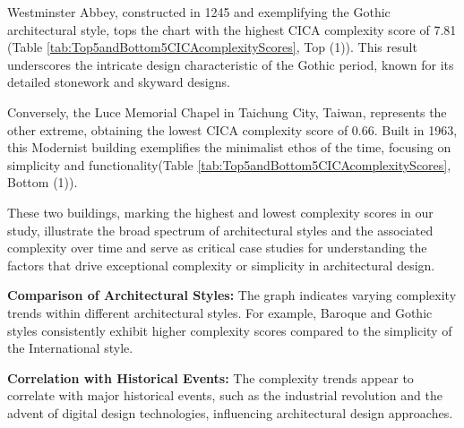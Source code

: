Westminster Abbey, constructed in 1245 and exemplifying the Gothic architectural style, tops the chart with the highest CICA complexity score of 7.81 (Table \ref{tab:Top5andBottom5CICAcomplexityScores}, Top (1)).
This result underscores the intricate design characteristic of the Gothic period, known for its detailed stonework and skyward designs\cite{Stacbond2020}.

Conversely, the Luce Memorial Chapel in Taichung City, Taiwan, represents the other extreme, obtaining the lowest CICA complexity score of 0.66.
Built in 1963, this Modernist building exemplifies the minimalist ethos of the time, focusing on simplicity and functionality(Table \ref{tab:Top5andBottom5CICAcomplexityScores}, Bottom (1)).

These two buildings, marking the highest and lowest complexity scores in our study, illustrate the broad spectrum of architectural styles and the associated complexity over time and serve as critical case studies for understanding the factors that drive exceptional complexity or simplicity in architectural design.


\textbf{Comparison of Architectural Styles:} The graph indicates varying complexity trends within different architectural styles.
For example, Baroque and Gothic styles consistently exhibit higher complexity scores compared to the simplicity of the International style.

\textbf{Correlation with Historical Events:} The complexity trends appear to correlate with major historical events, such as the industrial revolution and the advent of digital design technologies, influencing architectural design approaches.










